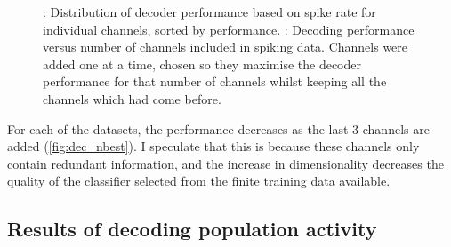 \begin{figure}[htbp]
    \centering
    \hspace*{\fill}
    \hspace*{\fill}\hspace{.2cm}\hspace*{\fill}
    \hspace*{\fill}
    \caption{
\protect{}: Distribution of decoder performance based on spike rate for individual channels, sorted by performance.
\protect{}: Decoding performance versus number of channels included in spiking data.
Channels were added one at a time, chosen so they maximise the decoder performance for that number of channels whilst keeping all the channels which had come before.
}
    \label{fig:dec_n}
\end{figure}

For each of the datasets, the performance decreases as the last \num{3} channels are added (\autoref{fig:dec_nbest}).
I speculate that this is because these channels only contain redundant information, and the increase in dimensionality decreases the quality of the classifier selected from the finite training data available.


\subsection{Results of decoding population activity}


